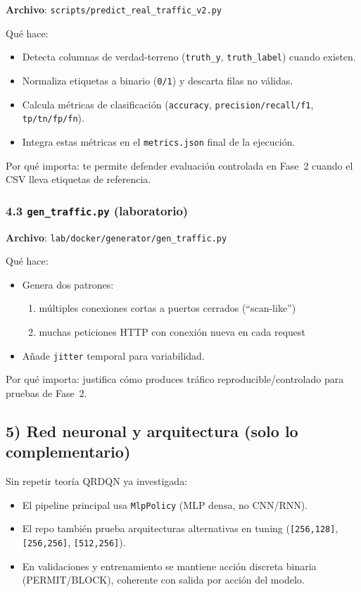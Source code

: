 ﻿\documentclass[12pt,a4paper]{article}
\begin{document}
\textbf{Archivo}: \verb|scripts/predict_real_traffic_v2.py|

Qué hace:

\begin{itemize}
  \item Detecta columnas de verdad-terreno (\texttt{truth\_y}, \texttt{truth\_label}) cuando
        existen.
  \item Normaliza etiquetas a binario (\texttt{0/1}) y descarta filas no válidas.
  \item Calcula métricas de clasificación
        (\texttt{accuracy}, \texttt{precision/recall/f1}, \texttt{tp/tn/fp/fn}).
  \item Integra estas métricas en el \texttt{metrics.json} final de la ejecución.
\end{itemize}

Por qué importa: te permite defender evaluación controlada en Fase~2 cuando el CSV lleva etiquetas
de referencia.

\subsubsection{4.3 \texttt{gen\_traffic.py} (laboratorio)}

\textbf{Archivo}: \verb|lab/docker/generator/gen_traffic.py|

Qué hace:

\begin{itemize}
  \item Genera dos patrones:
    \begin{enumerate}
      \item múltiples conexiones cortas a puertos cerrados (``scan-like'')
      \item muchas peticiones HTTP con conexión nueva en cada request
    \end{enumerate}
  \item Añade \texttt{jitter} temporal para variabilidad.
\end{itemize}

Por qué importa: justifica cómo produces tráfico reproducible/controlado para pruebas de Fase~2.

\subsection{5) Red neuronal y arquitectura (solo lo complementario)}

Sin repetir teoría QRDQN ya investigada:

\begin{itemize}
  \item El pipeline principal usa \texttt{MlpPolicy} (MLP densa, no CNN/RNN).
  \item El repo también prueba arquitecturas alternativas en tuning
        (\texttt{[256,128]}, \texttt{[256,256]}, \texttt{[512,256]}).
  \item En validaciones y entrenamiento se mantiene acción discreta binaria (PERMIT/BLOCK),
        coherente con salida por acción del modelo.
\end{itemize}
\end{document}
